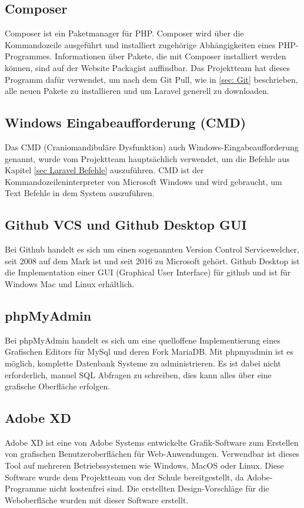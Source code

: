 \subsection{Composer}
Composer ist ein Paketmanager für PHP. Composer wird über die Kommandozeile ausgeführt und installiert zugehörige Abhängigkeiten eines PHP-Programmes. Informationen über Pakete, die mit Composer installiert werden können, sind auf der Website Packagist auffindbar. Das Projektteam hat dieses Programm dafür verwendet, um nach dem Git Pull, wie in \ref{sec: Git} beschrieben, alle neuen Pakete zu installieren und um Laravel generell zu downloaden.
\subsection{Windows Eingabeaufforderung (CMD)}
Das CMD (\glqq Craniomandibuläre Dysfunktion\grqq) auch Windows-Eingabeaufforderung genannt, wurde vom Projektteam hauptsächlich verwendet, um die Befehle aus Kapitel \ref{sec Laravel Befehle} auszuführen. CMD ist der Kommandozeileninterpreter von Microsoft Windows und wird gebraucht, um Text Befehle in dem System auszuführen. 
\subsection{Github VCS und Github Desktop GUI}
Bei Github handelt es sich um einen sogenannten \glqq Version Control Service\grqq \space welcher, seit 2008 auf dem Mark ist und seit 2016 zu Microsoft gehört. Github Desktop ist die Implementation einer GUI (Graphical User Interface) für github und ist für Windows Mac und Linux erhältlich.

\newpage
\subsection{ phpMyAdmin}
Bei phpMyAdmin handelt es sich um eine quelloffene Implementierung eines Grafischen Editors für MySql und deren Fork MariaDB. Mit phpmyadmin ist es möglich, komplette Datenbank Systeme zu administrieren. Es ist dabei nicht erforderlich, manuel SQL Abfragen zu schreiben, dies kann alles über eine grafische Oberfläche erfolgen.  
\subsection{Adobe XD}
Adobe XD ist eine von Adobe Systems entwickelte Grafik-Software zum Erstellen von grafischen Benutzeroberflächen für Web-Anwendungen. Verwendbar ist dieses Tool auf mehreren Betriebssystemen wie Windows, MacOS oder Linux. Diese Software wurde dem Projektteam von der Schule bereitgestellt, da Adobe-Programme nicht kostenfrei sind. Die erstellten Design-Vorschläge für die Weboberfläche wurden mit dieser Software erstellt. 


